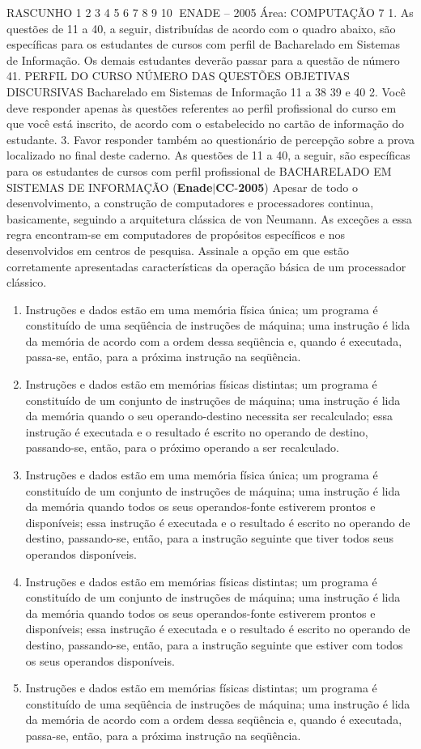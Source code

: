 \documentclass{exam}
\begin{document}
\begin{questions}
RASCUNHO
1
2
3
4
5
6
7
8
9
10
ENADE – 2005 Área: COMPUTAÇÃO 7
1. As questões de 11 a 40, a seguir, distribuídas de acordo com o quadro abaixo, são
específicas para os estudantes de cursos com perfil de Bacharelado em Sistemas de
Informação. Os demais estudantes deverão passar para a questão de número 41.
PERFIL DO CURSO
NÚMERO DAS QUESTÕES
OBJETIVAS DISCURSIVAS
Bacharelado em Sistemas de Informação 11 a 38 39 e 40
2. Você deve responder apenas às questões referentes ao perfil profissional do curso em que
você está inscrito, de acordo com o estabelecido no cartão de informação do estudante.
3. Favor responder também ao questionário de percepção sobre a prova localizado no final
deste caderno.
As questões de 11 a 40, a seguir, são específicas para os estudantes de cursos com perfil profissional de
BACHARELADO EM SISTEMAS DE INFORMAÇÃO
\question (\textbf{Enade}$|$\textbf{CC}-\textbf{2005}) Apesar de todo o desenvolvimento, a construção de computadores
e processadores continua, basicamente, seguindo a arquitetura
clássica de von Neumann. As exceções a essa regra encontram-se
em computadores de propósitos específicos e nos desenvolvidos
em centros de pesquisa. Assinale a opção em que estão
corretamente apresentadas características da operação básica de
um processador clássico.
	\begin{enumerate}[label=\alph*)]
		\item  Instruções e dados estão em uma memória física única; um
programa é constituído de uma seqüência de instruções de
máquina; uma instrução é lida da memória de acordo com a
ordem dessa seqüência e, quando é executada, passa-se, então,
para a próxima instrução na seqüência.
		\item  Instruções e dados estão em memórias físicas distintas; um
programa é constituído de um conjunto de instruções de
máquina; uma instrução é lida da memória quando o seu
operando-destino necessita ser recalculado; essa instrução é
executada e o resultado é escrito no operando de destino,
passando-se, então, para o próximo operando a ser recalculado.
		\item  Instruções e dados estão em uma memória física única; um
programa é constituído de um conjunto de instruções de
máquina; uma instrução é lida da memória quando todos os
seus operandos-fonte estiverem prontos e disponíveis; essa
instrução é executada e o resultado é escrito no operando de
destino, passando-se, então, para a instrução seguinte que tiver
todos seus operandos disponíveis.
		\item  Instruções e dados estão em memórias físicas distintas; um
programa é constituído de um conjunto de instruções de
máquina; uma instrução é lida da memória quando todos os
seus operandos-fonte estiverem prontos e disponíveis; essa
instrução é executada e o resultado é escrito no operando de
destino, passando-se, então, para a instrução seguinte que
estiver com todos os seus operandos disponíveis.
		\item  Instruções e dados estão em memórias físicas distintas; um
programa é constituído de uma seqüência de instruções de
máquina; uma instrução é lida da memória de acordo com a
ordem dessa seqüência e, quando é executada, passa-se, então,
para a próxima instrução na seqüência.


\end{enumerate}
\end{questions}
\end{document}
